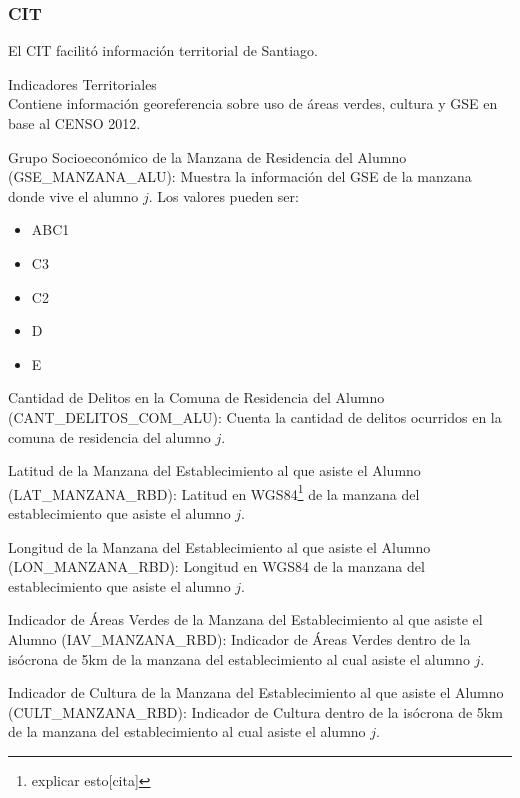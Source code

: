 \subsubsection{CIT}
El CIT facilitó información territorial de Santiago.
\begin{longdescription}
  \item[Indicadores Territoriales] \hfill \\
  Contiene información georeferencia sobre uso de áreas verdes, cultura y GSE en base al CENSO 2012.
    \begin{longdescription}
        \item[Grupo Socioeconómico de la Manzana de Residencia del Alumno] (GSE\_MANZANA\_ALU): Muestra la información del GSE de la manzana donde vive el alumno $j$.
        Los valores pueden ser:
        \begin{itemize}
        \item ABC1
        \item C3
        \item C2
        \item D
        \item E
        \end{itemize}
        \item[Cantidad de Delitos en la Comuna de Residencia del Alumno](CANT\_DELITOS\_COM\_ALU): Cuenta la cantidad de delitos ocurridos en la comuna de residencia del alumno $j$.
        
        \item[Latitud de la Manzana del Establecimiento al que asiste el Alumno](LAT\_MANZANA\_RBD): Latitud en WGS84\footnote{explicar esto[cita]} de la manzana del establecimiento que asiste el alumno $j$.
        
        \item[Longitud de la Manzana del Establecimiento al que asiste el Alumno](LON\_MANZANA\_RBD): Longitud en WGS84 de la manzana del establecimiento que asiste el alumno $j$.
        
        \item[Indicador de Áreas Verdes de la Manzana del Establecimiento al que asiste el Alumno](IAV\_MANZANA\_RBD): Indicador de Áreas Verdes dentro de la isócrona de 5km de la manzana del establecimiento al cual asiste el alumno $j$.
        
        \item[Indicador de Cultura de la Manzana del Establecimiento al que asiste el Alumno ](CULT\_MANZANA\_RBD): Indicador de Cultura dentro de la isócrona de 5km de la manzana del establecimiento al cual asiste el alumno $j$.
        

\end{longdescription}
\end{longdescription}
